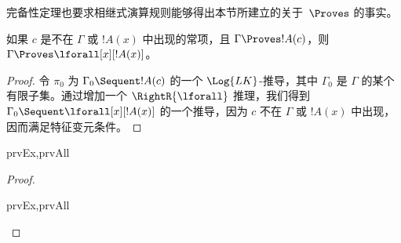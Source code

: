 \documentclass[../../../include/open-logic-section]{subfiles}
\begin{document}

\begin{explain}
  完备性定理也要求相继式演算规则能够得出本节所建立的关于~$\Proves$ 的事实。
\end{explain}

\begin{thm}
 如果 $c$ 是不在 $\Gamma$ 或 $!A(x)$ 中出现的常项，且 $\Gamma \Proves !A(c)$，则 $\Gamma
\Proves \lforall[x][!A(x)]$。
\end{thm}

\begin{proof}
令 $\pi_0$ 为 $\Gamma_0 \Sequent !A(c)$ 的一个 $\Log{LK}$-推导，其中 $\Gamma_0$ 是 $\Gamma$ 的某个有限子集。通过增加一个 $\RightR{\lforall}$ 推理，我们得到 $\Gamma_0 \Sequent
\lforall[x][!A(x)]$ 的一个推导，因为 $c$ 不在 $\Gamma$ 或 $!A(x)$ 中出现，因而满足特征变元条件。
\end{proof}

\begin{prop}
\begin{tagenumerate}{prvEx,prvAll}
\end{tagenumerate}
\end{prop}

\begin{proof}
\begin{tagenumerate}{prvEx,prvAll}
\end{tagenumerate}
\end{proof}
\end{document}
